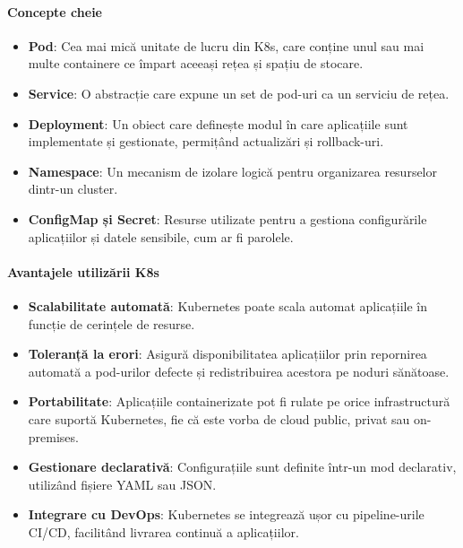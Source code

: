 \documentclass[titlepage,12pt]{article}
\begin{document}
\paragraph{Concepte cheie}
\begin{itemize}
    \item \textbf{Pod}: Cea mai mică unitate de lucru din \ac {K8s}, care conține unul sau mai multe containere ce împart aceeași rețea și spațiu de stocare.
    \item \textbf{Service}: O abstracție care expune un set de pod-uri ca un serviciu de rețea.
    \item \textbf{Deployment}: Un obiect care definește modul în care aplicațiile sunt implementate și gestionate, permițând actualizări și rollback-uri.
    \item \textbf{Namespace}: Un mecanism de izolare logică pentru organizarea resurselor dintr-un cluster.
    \item \textbf{ConfigMap și Secret}: Resurse utilizate pentru a gestiona configurările aplicațiilor și datele sensibile, cum ar fi parolele.
\end{itemize}

\paragraph{Avantajele utilizării \ac {K8s}}
\begin{itemize}
    \item \textbf{Scalabilitate automată}: Kubernetes poate scala automat aplicațiile în funcție de cerințele de resurse.
    \item \textbf{Toleranță la erori}: Asigură disponibilitatea aplicațiilor prin repornirea automată a pod-urilor defecte și redistribuirea acestora pe noduri sănătoase.
    \item \textbf{Portabilitate}: Aplicațiile containerizate pot fi rulate pe orice infrastructură care suportă Kubernetes, fie că este vorba de cloud public, privat sau on-premises.
    \item \textbf{Gestionare declarativă}: Configurațiile sunt definite într-un mod declarativ, utilizând fișiere YAML sau JSON.
    \item \textbf{Integrare cu DevOps}: Kubernetes se integrează ușor cu pipeline-urile CI/CD, facilitând livrarea continuă a aplicațiilor.
\end{itemize}
\end{document}
